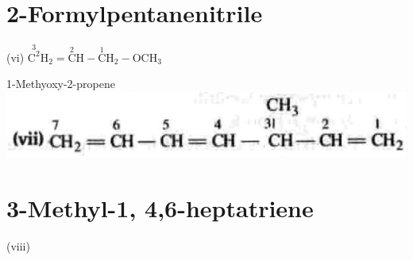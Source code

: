 \documentclass[10pt]{article}
\begin{document}
\section*{2-Formylpentanenitrile}
(vi) $\stackrel{3}{\mathrm{C}^{2}} \mathrm{H}_{2}=\stackrel{2}{\mathrm{C}} \mathrm{H}-\stackrel{1}{\mathrm{C}} \mathrm{H}_{2}-\mathrm{OCH}_{3}$

1-Methyoxy-2-propene\\
\includegraphics[max width=\textwidth, center]{2025_01_28_8470952b98110cec3aabg-167(2)}

\section*{3-Methyl-1, 4,6-heptatriene}
(viii)\\
\end{document}
